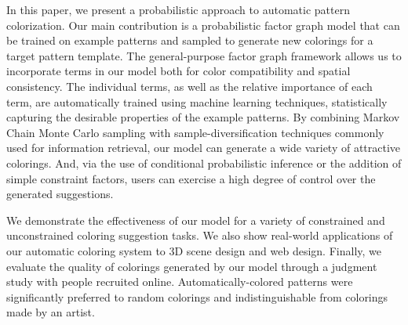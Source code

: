 In this paper, we present a probabilistic approach to automatic pattern colorization. Our main contribution is a probabilistic factor graph model that can be trained on example patterns and sampled to generate new colorings for a target pattern template. The general-purpose factor graph framework allows us to incorporate terms in our model both for color compatibility and spatial consistency. The individual terms, as well as the relative importance of each term, are automatically trained using machine learning techniques, statistically capturing the desirable properties of the example patterns. By combining Markov Chain Monte Carlo sampling with sample-diversification techniques commonly used for information retrieval, our model can generate a wide variety of attractive colorings. And, via the use of conditional probabilistic inference or the addition of simple constraint factors, users can exercise a high degree of control over the generated suggestions.

We demonstrate the effectiveness of our model for a variety of constrained and unconstrained coloring suggestion tasks. We also show real-world applications of our automatic coloring system to 3D scene design and web design. Finally, we evaluate the quality of colorings generated by our model through a judgment study with people recruited online. Automatically-colored patterns were significantly preferred to random colorings and indistinguishable from colorings made by an artist.